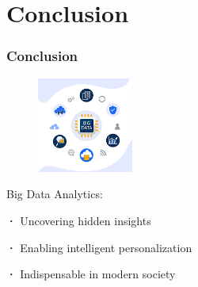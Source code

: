\documentclass{beamer}
\begin{document}
\section{Conclusion}
\begin{frame}
  \frametitle{Conclusion}

  \begin{figure}
    \includegraphics[width=0.28\textwidth]{figure 2.png}
    \label{fig:bigdata_conclusion}
  \end{figure}

  {\Large Big Data Analytics:}
  
  \vspace{2 em}
  
  {\Large \textbf{·} Uncovering hidden insights}
  
  \vspace{1 em}
  
  {\Large \textbf{·} Enabling intelligent personalization}
  
  \vspace{1.75 em}
  
  {\Large \textbf{·} Indispensable in modern society}

\end{frame}
\end{document}

